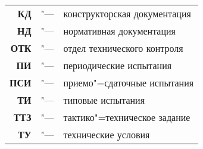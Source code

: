 \noindent
\begin{longtabu} to 
	КД & & конструкторская документация \\
	НД & & нормативная документация \\
	ОТК & & отдел технического контроля \\
	ПИ & & периодические испытания \\
	ПСИ & & приемо"=сдаточные испытания \\
	ТИ & & типовые испытания \\
	ТТЗ & & тактико"=техническое задание \\ 	
	ТУ & & технические условия
\end{longtabu}
\addtocounter{table}{-1}%
